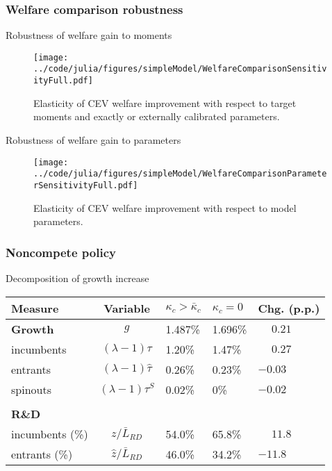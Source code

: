 \documentclass[english,usenames,dvipsnames]{beamer}
\begin{document}
\subsubsection{Welfare comparison robustness}

\begin{frame}{Robustness of welfare gain to moments}\label{robustness_to_moments}
\hyperlink{reducing_kappa_c_table}{}
	\begin{figure}
		\texttt{[image: ../code/julia/figures/simpleModel/WelfareComparisonSensitivityFull.pdf]}
		\caption{Elasticity of CEV welfare improvement with respect to target moments and exactly or externally calibrated parameters.}
		\label{WelfareComparisonSensitivityFull}
	\end{figure}
\end{frame}

\begin{frame}{Robustness of welfare gain to parameters}\label{robustness_to_parameters}
	\hyperlink{reducing_kappa_c_table}{}
	\begin{figure}
		\texttt{[image: ../code/julia/figures/simpleModel/WelfareComparisonParameterSensitivityFull.pdf]}
		\caption{Elasticity of CEV welfare improvement with respect to model parameters.}
		\label{WelfareComparisonSensitivityFull}
	\end{figure}
\end{frame}


\subsubsection{Noncompete policy}

\begin{frame}{Decomposition of growth increase}\label{decomposition_growth_increase}
	\hyperlink{reducing_kappa_c_table}{}
	\begin{table}
		\centering
		\footnotesize
		\begin{tabular}{lclll}
			\toprule \toprule
			Measure & Variable & $\kappa_c > \bar{\kappa}_c$ & $\kappa_c = 0$ & Chg. (p.p.) \tabularnewline
			\midrule
			\textbf{Growth} & $g$ & 1.487\% & 1.696\% & $\phantom{-}0.21$\tabularnewline
			\multicolumn{1}{l}{\quad incumbents} & $(\lambda -1) \tau$  & 1.20\% & 1.47\% & $\phantom{-}0.27$ \tabularnewline
			\multicolumn{1}{l}{\quad entrants} & $(\lambda -1) \hat{\tau}$ & 0.26\% & 0.23\% & $-0.03$ \tabularnewline
			\multicolumn{1}{l}{\quad spinouts} & $(\lambda -1) \tau^S$ & 0.02\% & 0\% & $-0.02$\tabularnewline
			\tabularnewline
			\textbf{R\&D} & & & & 
			\tabularnewline
			\multicolumn{1}{l}{\quad incumbents (\%)}  & $z / \bar{L}_{RD}$ & 54.0\% & 65.8\% & $\phantom{-}11.8$ \tabularnewline 
			
			\multicolumn{1}{l}{\quad entrants (\%)}  & $\hat{z} / \bar{L}_{RD}$ & 46.0\% & 34.2\% & $-11.8$ \tabularnewline
			\bottomrule
		\end{tabular}
	\end{table}
\end{frame}
\end{document}
